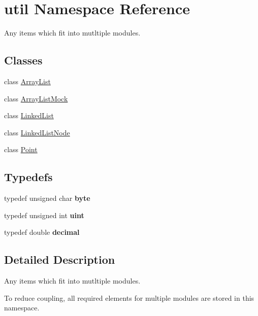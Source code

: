 \hypertarget{namespaceutil}{}\section{util Namespace Reference}
\label{namespaceutil}


Any items which fit into mutltiple modules.  


\subsection*{Classes}
\begin{DoxyCompactItemize}
\item 
class \hyperlink{classutil_1_1ArrayList}{Array\+List}
\item 
class \hyperlink{classutil_1_1ArrayListMock}{Array\+List\+Mock}
\item 
class \hyperlink{classutil_1_1LinkedList}{Linked\+List}
\item 
class \hyperlink{classutil_1_1LinkedListNode}{Linked\+List\+Node}
\item 
class \hyperlink{classutil_1_1Point}{Point}
\end{DoxyCompactItemize}
\subsection*{Typedefs}
\begin{DoxyCompactItemize}
\item 
\mbox{\label{namespaceutil_adcc498ff9edd6ed0c34c6a3b695da64c}} 
typedef unsigned char {\bfseries byte}
\item 
\mbox{\label{namespaceutil_a876404cea2ec32c6a862072ad3291b5a}} 
typedef unsigned int {\bfseries uint}
\item 
\mbox{\label{namespaceutil_a93a0de53a9cbe440bc768d9f4d94ce89}} 
typedef double {\bfseries decimal}
\end{DoxyCompactItemize}


\subsection{Detailed Description}
Any items which fit into mutltiple modules. 

To reduce coupling, all required elements for multiple modules are stored in this namespace. 